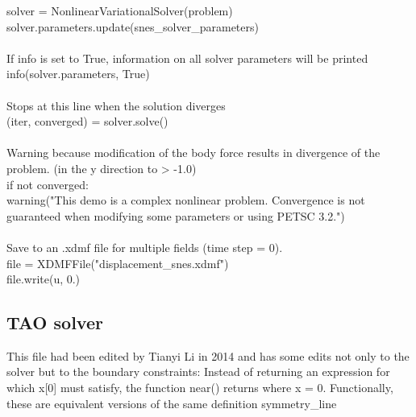 \documentclass[12pt,3p]{article}
\begin{document}
{\selectfont
solver = NonlinearVariationalSolver(problem) \\
solver.parameters.update(snes\_solver\_parameters) \\ \\
}
If {\selectfont info} is set to True, information on all solver parameters will be printed \\
{\selectfont
info(solver.parameters, True) \\ \\
}
Stops at this line when the solution diverges \\ 
{\selectfont
(iter, converged) = solver.solve() \\ \\ 
}
Warning because modification of the body force results in divergence of the problem. (in the y direction to > -1.0)  \\
{\selectfont
if not converged: \\
\indent warning("This demo is a complex nonlinear problem. Convergence is not guaranteed when modifying some parameters or using PETSC 3.2.") \\ \\
} 
Save to an .xdmf file for multiple fields (time step = 0). \\
{\selectfont
file = XDMFFile("displacement\_snes.xdmf") \\
file.write(u, 0.) 
}

\subsection{TAO solver} 
This file had been edited by Tianyi Li in 2014 and has some edits not only to the solver but to the boundary constraints: Instead of returning an expression for which x[0] must satisfy, the function {\selectfont near()} returns where x = 0. Functionally, these are equivalent versions of the same definition {\selectfont symmetry\_line} \\
\end{document}
